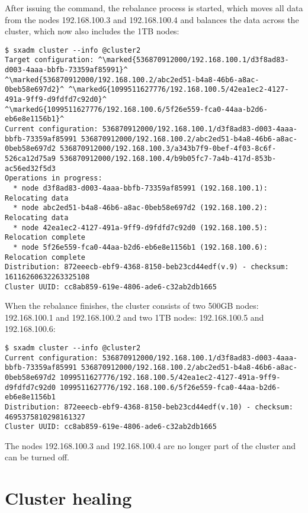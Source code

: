 After issuing the command, the rebalance process is started, which moves all
data from the nodes 192.168.100.3 and 192.168.100.4 and balances the data across
the cluster, which now also includes the 1TB nodes:
\begin{lstlisting}
$ sxadm cluster --info @cluster2
Target configuration: ^\marked{536870912000/192.168.100.1/d3f8ad83-d003-4aaa-bbfb-73359af85991}^ ^\marked{536870912000/192.168.100.2/abc2ed51-b4a8-46b6-a8ac-0beb58e697d2}^ ^\markedG{1099511627776/192.168.100.5/42ea1ec2-4127-491a-9ff9-d9fdfd7c92d0}^ ^\markedG{1099511627776/192.168.100.6/5f26e559-fca0-44aa-b2d6-eb6e8e1156b1}^
Current configuration: 536870912000/192.168.100.1/d3f8ad83-d003-4aaa-bbfb-73359af85991 536870912000/192.168.100.2/abc2ed51-b4a8-46b6-a8ac-0beb58e697d2 536870912000/192.168.100.3/a343b7f9-0bef-4f03-8c6f-526ca12d75a9 536870912000/192.168.100.4/b9b05fc7-7a4b-417d-853b-ac56ed32f5d3
Operations in progress:
  * node d3f8ad83-d003-4aaa-bbfb-73359af85991 (192.168.100.1): Relocating data
  * node abc2ed51-b4a8-46b6-a8ac-0beb58e697d2 (192.168.100.2): Relocating data
  * node 42ea1ec2-4127-491a-9ff9-d9fdfd7c92d0 (192.168.100.5): Relocation complete
  * node 5f26e559-fca0-44aa-b2d6-eb6e8e1156b1 (192.168.100.6): Relocation complete
Distribution: 872eeecb-ebf9-4368-8150-beb23cd44edf(v.9) - checksum: 16116260632263325108
Cluster UUID: cc8ab859-619e-4806-ade6-c32ab2db1665
\end{lstlisting}
When the rebalance finishes, the cluster consists of two 500GB nodes:
192.168.100.1 and 192.168.100.2 and two 1TB nodes: 192.168.100.5 and
192.168.100.6:
\begin{lstlisting}
$ sxadm cluster --info @cluster2
Current configuration: 536870912000/192.168.100.1/d3f8ad83-d003-4aaa-bbfb-73359af85991 536870912000/192.168.100.2/abc2ed51-b4a8-46b6-a8ac-0beb58e697d2 1099511627776/192.168.100.5/42ea1ec2-4127-491a-9ff9-d9fdfd7c92d0 1099511627776/192.168.100.6/5f26e559-fca0-44aa-b2d6-eb6e8e1156b1
Distribution: 872eeecb-ebf9-4368-8150-beb23cd44edf(v.10) - checksum: 4695375810298161327
Cluster UUID: cc8ab859-619e-4806-ade6-c32ab2db1665
\end{lstlisting}
The nodes 192.168.100.3 and 192.168.100.4 are no longer part of the cluster
and can be turned off.

\section{Cluster healing}

